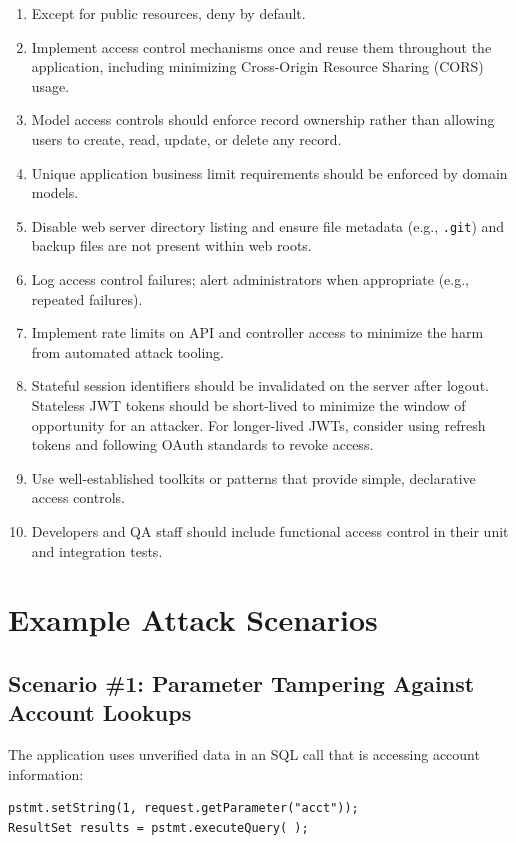 \documentclass[11pt]{article}
\begin{document}
\begin{enumerate}
  \item Except for public resources, deny by default.
  \item Implement access control mechanisms once and reuse them throughout the application, including minimizing Cross-Origin Resource Sharing (CORS) usage.
  \item Model access controls should enforce record ownership rather than allowing users to create, read, update, or delete any record.
  \item Unique application business limit requirements should be enforced by domain models.
  \item Disable web server directory listing and ensure file metadata (e.g., \texttt{.git}) and backup files are not present within web roots.
  \item Log access control failures; alert administrators when appropriate (e.g., repeated failures).
  \item Implement rate limits on API and controller access to minimize the harm from automated attack tooling.
  \item Stateful session identifiers should be invalidated on the server after logout. Stateless JWT tokens should be short-lived to minimize the window of opportunity for an attacker. For longer-lived JWTs, consider using refresh tokens and following OAuth standards to revoke access.
  \item Use well-established toolkits or patterns that provide simple, declarative access controls.
  \item Developers and QA staff should include functional access control in their unit and integration tests.
\end{enumerate}

\section{Example Attack Scenarios}

\subsection{Scenario \#1: Parameter Tampering Against Account Lookups}
The application uses unverified data in an SQL call that is accessing account information:

\begin{codebox}
\begin{verbatim}
pstmt.setString(1, request.getParameter("acct"));
ResultSet results = pstmt.executeQuery( );
\end{verbatim}
\end{codebox}
\end{document}
